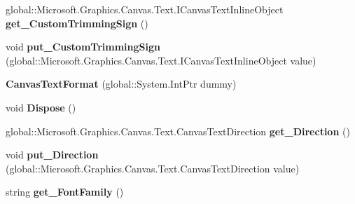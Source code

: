 \begin{DoxyCompactItemize}
global\+::\+Microsoft.\+Graphics.\+Canvas.\+Text.\+I\+Canvas\+Text\+Inline\+Object {\bfseries get\+\_\+\+Custom\+Trimming\+Sign} ()
\item 
\mbox{\label{class_microsoft_1_1_graphics_1_1_canvas_1_1_text_1_1_canvas_text_format_a28ea164db75b0d1e4f012001370dc6f8}} 
void {\bfseries put\+\_\+\+Custom\+Trimming\+Sign} (global\+::\+Microsoft.\+Graphics.\+Canvas.\+Text.\+I\+Canvas\+Text\+Inline\+Object value)
\item 
\mbox{\label{class_microsoft_1_1_graphics_1_1_canvas_1_1_text_1_1_canvas_text_format_a8cbafb823def969fc2ed24c98d5016f7}} 
{\bfseries Canvas\+Text\+Format} (global\+::\+System.\+Int\+Ptr dummy)
\item 
\mbox{\label{class_microsoft_1_1_graphics_1_1_canvas_1_1_text_1_1_canvas_text_format_a174c6d766e1732425a63a7ee7ca6a9bb}} 
void {\bfseries Dispose} ()
\item 
\mbox{\label{class_microsoft_1_1_graphics_1_1_canvas_1_1_text_1_1_canvas_text_format_a47023dedd64cd980189d5fc8fe614629}} 
global\+::\+Microsoft.\+Graphics.\+Canvas.\+Text.\+Canvas\+Text\+Direction {\bfseries get\+\_\+\+Direction} ()
\item 
\mbox{\label{class_microsoft_1_1_graphics_1_1_canvas_1_1_text_1_1_canvas_text_format_a345d3dff62bda0ba2440e40e7a5abbc6}} 
void {\bfseries put\+\_\+\+Direction} (global\+::\+Microsoft.\+Graphics.\+Canvas.\+Text.\+Canvas\+Text\+Direction value)
\item 
\mbox{\label{class_microsoft_1_1_graphics_1_1_canvas_1_1_text_1_1_canvas_text_format_a49be7f6687260bafd4e46d160d645c7c}} 
string {\bfseries get\+\_\+\+Font\+Family} ()
\item 
\mbox{\label{class_microsoft_1_1_graphics_1_1_canvas_1_1_text_1_1_canvas_text_format_a7b755c0c506c4ca08e5019ddb932ce37}} 

\end{DoxyCompactItemize}
